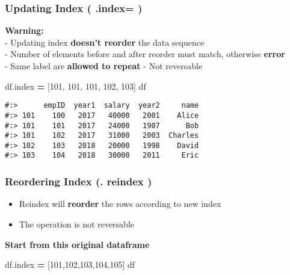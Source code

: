 \documentclass[
]{book}
\newenvironment{Shaded}{\begin{snugshade}}{\end{snugshade}}
\newcommand{\DecValTok}[1]{\textcolor[rgb]{0.06,0.06,0.06}{#1}}
\newcommand{\NormalTok}[1]{#1}
\newcommand{\OperatorTok}[1]{\textcolor[rgb]{0.43,0.43,0.43}{\textbf{#1}}}
\providecommand{\tightlist}{%
  \setlength{\itemsep}{0pt}\setlength{\parskip}{0pt}}
\begin{document}
\hypertarget{updating-index-.index}{%
\subsubsection{Updating Index ( .index= )}\label{updating-index-.index}}

\textbf{Warning:}\\
- Updating index \textbf{doesn't reorder} the data sequence\\
- Number of elements before and after reorder must match, otherwise \textbf{error}\\
- Same label are \textbf{allowed to repeat} - Not reversable

\begin{Shaded}
\begin{Highlighting}[]
\NormalTok{df.index }\OperatorTok{=}\NormalTok{ [}\DecValTok{101}\NormalTok{, }\DecValTok{101}\NormalTok{, }\DecValTok{101}\NormalTok{, }\DecValTok{102}\NormalTok{, }\DecValTok{103}\NormalTok{]}
\NormalTok{df}
\end{Highlighting}
\end{Shaded}

\begin{verbatim}
#:>      empID  year1  salary  year2     name
#:> 101    100   2017   40000   2001    Alice
#:> 101    101   2017   24000   1907      Bob
#:> 101    102   2017   31000   2003  Charles
#:> 102    103   2018   20000   1998    David
#:> 103    104   2018   30000   2011     Eric
\end{verbatim}

\hypertarget{reordering-index-.-reindex}{%
\subsubsection{Reordering Index (. reindex )}\label{reordering-index-.-reindex}}

\begin{itemize}
\tightlist
\item
  Reindex will \textbf{reorder} the rows according to new index\\
\item
  The operation is not reversable
\end{itemize}

\textbf{Start from this original dataframe}

\begin{Shaded}
\begin{Highlighting}[]
\NormalTok{df.index }\OperatorTok{=}\NormalTok{ [}\DecValTok{101}\NormalTok{,}\DecValTok{102}\NormalTok{,}\DecValTok{103}\NormalTok{,}\DecValTok{104}\NormalTok{,}\DecValTok{105}\NormalTok{]}
\NormalTok{df}
\end{Highlighting}
\end{Shaded}
\end{document}
